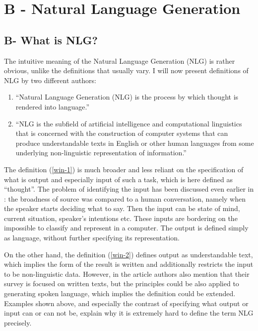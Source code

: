 \chapter{B - Natural Language Generation}\label{chap:nlg}

\section{B- What is NLG?}
The intuitive meaning of the Natural Language Generation (NLG) is rather obvious, unlike the definitions that usually vary. I will now present definitions of NLG by two different authors:
\begin{enumerate}
	\item “Natural Language Generation (NLG) is the process by which thought is rendered into language.”\label{win-1}\cite{mcdonald2010natural}
	\item “NLG is the subfield of artificial intelligence and computational linguistics that is concerned with the construction of computer systems that can produce understandable texts in English or other human languages from some underlying non-linguistic representation of information.”\label{win-2}\cite{reiter1997building}
\end{enumerate}

The definition (\ref{win-1}) is much broader and less reliant on the specification of what is output and especially input of such a task, which is here defined as “thought”. The problem of identifying the input has been discussed even earlier in \cite{mcdonald1993issues}: the broadness of source was compared to a human conversation, namely when the speaker starts deciding what to say. Then the input can be state of mind, current situation, speaker’s intentions etc. These inputs are bordering on the impossible to classify and represent in a computer. The output is defined simply as language, without further specifying its representation. 

On the other hand, the definition (\ref{win-2}) defines output as understandable text, which implies the form of the result is written and additionally restricts the input to be non-linguistic data. However, in the article authors also mention that their survey is focused on written texts, but the principles could be also applied to generating spoken language, which implies the definition could be extended. Examples shown above, and especially the contrast of specifying what output or input can or can not be, explain why it is extremely hard to define the term NLG precisely.
 
